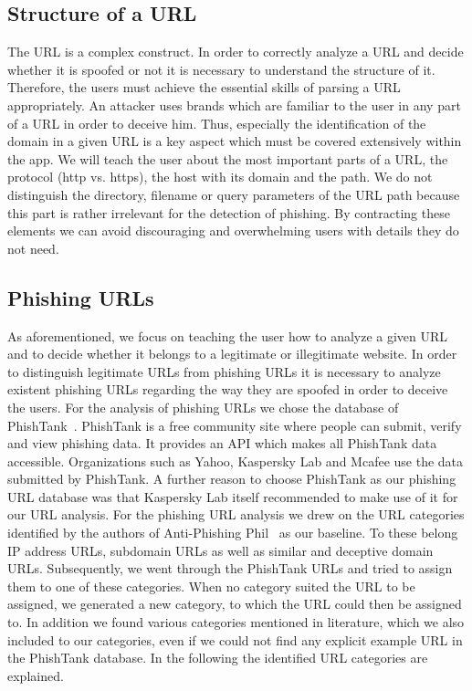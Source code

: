 \subsection{Structure of a URL}
\label{s:url_structure}
The URL is a complex construct. 
In order to correctly analyze a URL and decide whether it is spoofed or not it is necessary to understand the structure of it. 
Therefore, the users must achieve the essential skills of parsing a URL appropriately.
An attacker uses brands which are familiar to the user in any part of a URL in order to deceive him. 
Thus, especially the identification of the domain in a given URL is a key aspect which must be covered extensively within the app. 
We will teach the user about the most important parts of a URL, the protocol (http vs. https), the host with its domain and the path.
We do not distinguish the directory, filename or query parameters of the URL path because this part is rather irrelevant for the detection of phishing.
By contracting these elements we can avoid discouraging and overwhelming users with details they do not need.

\subsection{Phishing URLs}
As aforementioned, we focus on teaching the user how to analyze a given URL and to decide whether it belongs to a legitimate or illegitimate website.
 In order to distinguish legitimate URLs from phishing URLs it is necessary to analyze existent phishing URLs regarding the way they are spoofed in order to deceive the users.
 For the analysis of phishing URLs we chose the database of PhishTank~\cite{phishtank}.
PhishTank is a free community site where people can submit, verify and view phishing data.
 It provides an API which makes all PhishTank data accessible.
 Organizations such as Yahoo, Kaspersky Lab and Mcafee use the data submitted by PhishTank. A further reason to choose PhishTank as our phishing URL database was that Kaspersky Lab itself recommended to make use of it for our URL analysis.
 For the phishing URL analysis we drew on the URL categories identified by the authors of Anti-Phishing Phil~\cite{sheng2007antiphishingphil} as our baseline.
 To these belong IP address URLs, subdomain URLs as well as similar and deceptive domain URLs.
 Subsequently, we went through the PhishTank URLs and tried to assign them to one of these categories.
 When no category suited the URL to be assigned, we generated a new category, to which the URL could then be assigned to.
 In addition we found various categories mentioned in literature, which we also included to our categories, even if we could not find any explicit example URL in the PhishTank database.
 In the following the identified URL categories are explained.
